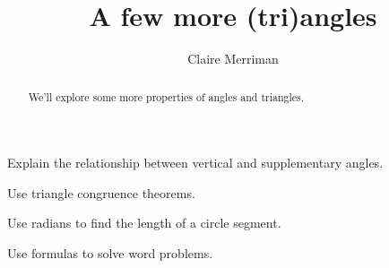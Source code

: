 \documentclass[noauthor,nooutcomes,handout]{ximera}
\title{A few more (tri)angles}
\author{Claire Merriman}
\begin{document}
\begin{abstract}
  We'll explore some more properties of angles and triangles.
\end{abstract}
\maketitle

\begin{listOutcomes}
\item Explain the relationship between vertical and supplementary angles.
\item Use triangle congruence theorems.
\item Use radians to find the length of a circle segment.
\item Use formulas to solve word problems.
\end{listOutcomes}



\mynewpage
\end{document}

